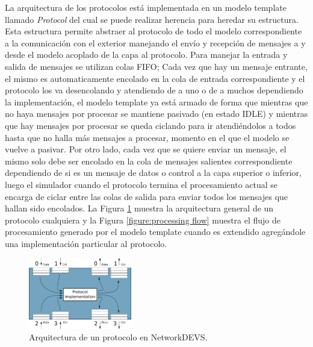 \documentclass[10pt,a4paper]{article}
\begin{document}
La arquitectura de los protocolos está implementada en un modelo template llamado \textit{Protocol} del cual se puede realizar herencia para heredar su estructura. Esta estructura permite abstraer al protocolo de todo el modelo correspondiente a la comunicación con el exterior manejando el envío y recepción de mensajes a y desde el modelo acoplado de la capa al protocolo. Para manejar la entrada y salida de mensajes se utilizan colas FIFO; Cada vez que hay un mensaje entrante, el mismo es automaticamente encolado en la cola de entrada correspondiente y el protocolo los va desencolando y atendiendo de a uno o de a muchos dependiendo la implementación, el modelo template ya está armado de forma que mientras que no haya mensajes por procesar se mantiene pasivado (en estado IDLE) y mientras que hay mensajes por procesar se queda ciclando para ir atendiéndolos a todos hasta que no halla más mensajes a procesar, momento en el que el modelo se vuelve a pasivar. Por otro lado, cada vez que se quiere enviar un mensaje, el mismo solo debe ser encolado en la cola de mensajes salientes correspondiente dependiendo de si es un mensaje de datos o control a la capa superior o inferior, luego el simulador cuando el protocolo termina el procesamiento actual se encarga de ciclar entre las colas de salida para enviar todos los mensajes que hallan sido encolados. La Figura \ref{figure:protocol general architecture} muestra la arquitectura general de un protocolo cualquiera y la Figura \ref{figure:processing flow} muestra el flujo de procesamiento generado por el modelo template cuando es extendido agregándole una implementación particular al protocolo.

\begin{figure}[!bht]
    \centering
    \includegraphics[width = 0.4\textwidth]{img/png/protocol_architecture.png}
    \caption{Arquitectura de un protocolo en NetworkDEVS.}
    \label{figure:protocol general architecture}
\end{figure}
\end{document}
